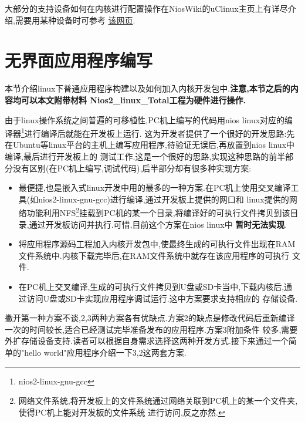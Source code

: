 \documentclass[12pt,a4paper,titlepage]{article}
\begin{document}
大部分的支持设备如何在内核进行配置操作在NiosWiki的uClinux主页上有详尽介绍,需要用某种设备时可参考
\href{http://www.nioswiki.com/OperatingSystems/UClinux}{该网页}.
\setcounter{footnote}{0}
\newpage{}
\section{无界面应用程序编写}
本节介绍linux下普通应用程序构建以及如何加入内核开发包中.\textbf{注意,本节之后的内容均可以本文附带材料
Nios2\_linux\_Total工程为硬件进行操作.}

由于linux操作系统之间普遍的可移植性,PC机上编写的代码用nios linux对应的编译器\footnote{nios2-linux-gnu-gcc}进行编译后就能在开发板上运行.
这为开发者提供了一个很好的开发思路:先在Ubuntu等linux平台的主机上编写应用程序,待验证无误后,再放置到nios linux中编译,最后进行开发板上的
测试工作.这是一个很好的思路,实现这种思路的前半部分没有区别(在PC机上编写,调试代码),后半部分却有很多种实现方案:
\begin{itemize}
\item 最便捷,也是嵌入式linux开发中用的最多的一种方案.在PC机上使用交叉编译工具(如nios2-linux-gnu-gcc)进行编译,通过开发板上提供的网口和
linux提供的网络功能利用NFS\footnote{网络文件系统,将开发板上的文件系统通过网络关联到PC机上的某一个文件夹,使得PC机上能对开发板的文件系统
进行访问,反之亦然.}挂载到PC机的某一个目录,将编译好的可执行文件拷贝到该目录,通过开发板访问并执行.可惜,目前这个方案在nios linux中
\textbf{暂时无法实现}.
\item 将应用程序源码工程加入内核开发包中,使最终生成的可执行文件出现在RAM文件系统中.内核下载完毕后,在RAM文件系统中就存在该应用程序的可执行
文件.
\item 在PC机上交叉编译,生成的可执行文件拷贝到U盘或SD卡当中,下载内核后,通过访问U盘或SD卡实现应用程序调试运行.这中方案要求支持相应的
存储设备.
\end{itemize}
撇开第一种方案不谈,2,3两种方案各有优缺点.方案2的缺点是修改代码后重新编译一次的时间较长,适合已经测试完毕准备发布的应用程序.方案3附加条件
较多,需要外扩存储设备支持.读者可以根据自身需求选择这两种开发方式.接下来通过一个简单的"hello world"应用程序介绍一下3,2这两套方案.
\end{document}
